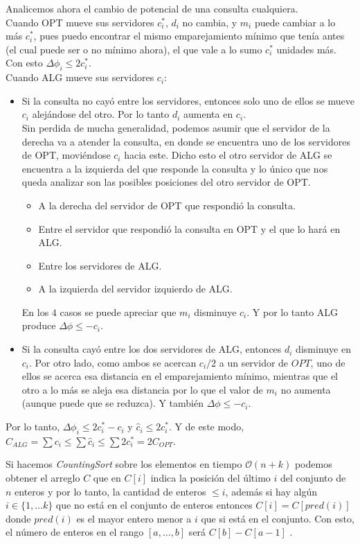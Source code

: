 \documentclass[dcc,uchile]{fcfmcourse}
\theoremstyle{plain}
\theoremstyle{definition}
\begin{document}
\begin{problems}
Analicemos ahora el cambio de potencial de una consulta cualquiera.\\
Cuando OPT mueve sus servidores $c^*_{i}$, $d_{i}$ no cambia, y $m_{i}$ puede cambiar a lo más $c^*_{i}$, pues puedo encontrar el mismo emparejamiento mínimo que tenía antes (el cual puede ser o no mínimo ahora), el que vale a lo sumo $c^*_{i}$ unidades más. Con esto $\Delta \phi_{i} \le 2c^*_{i}$.\\
Cuando ALG mueve sus servidores $c_{i}$:
\begin{itemize}
    \item Si la consulta no cayó entre los servidores, entonces solo uno de ellos se mueve $c_{i}$ alejándose del otro. Por lo tanto $d_{i}$ aumenta en $c_{i}$.\\
    Sin perdida de mucha generalidad, podemos asumir que el servidor de la derecha va a atender la consulta, en donde se encuentra uno de los servidores de OPT, moviéndose $c_{i}$ hacia este. Dicho esto el otro servidor de ALG se encuentra a la izquierda del que responde la consulta y lo único que nos queda analizar son las posibles posiciones del otro servidor de OPT.
    \begin{itemize}
        \item A la derecha del servidor de OPT que respondió la consulta.
        \item Entre el servidor que respondió la consulta en OPT y el que lo hará en ALG.
        \item Entre los servidores de ALG.
        \item A la izquierda del servidor izquierdo de ALG.
    \end{itemize}
    En los $4$ casos se puede apreciar que $m_{i}$ disminuye $c_{i}$. Y por lo tanto ALG produce $\Delta \phi \le -c_{i}$.
    \item Si la consulta cayó entre los dos servidores de ALG, entonces $d_{i}$ disminuye en $c_{i}$. Por otro lado, como ambos se acercan $c_{i}/2$ a un servidor de $OPT$, uno de ellos se acerca esa distancia en el emparejamiento mínimo, mientras que el otro a lo más se aleja esa distancia por lo que el valor de $m_{i}$ no aumenta (aunque puede que se reduzca). Y también $\Delta \phi \le -c_{i}$.
\end{itemize}
Por lo tanto, $\Delta \phi_{i} \le 2 c^*_{i} - c_{i}$ y $\hat{c}_{i} \le 2c^*_{i}$. Y de este modo, $C_{ALG} = \sum c_{i} \le \sum \hat{c}_{i} \le \sum 2c^*_{i} = 2C_{OPT}$.
\item Si hacemos \textit{CountingSort} sobre los elementos en tiempo $\mathcal{O}(n+k)$ podemos obtener el arreglo $C$ que en $C[i]$ indica la posición del último $i$ del conjunto de $n$ enteros y por lo tanto, la cantidad de enteros $\le i$, además si hay algún $i \in \{1,\ldots k\}$ que no está en el conjunto de enteros entonces $C[i] = C[pred(i)]$ donde $pred(i)$ es el mayor entero menor a $i$ que si está en el conjunto. Con esto, el número de enteros en el rango $[a,\ldots,b]$ será $C[b]-C[a-1]$ \grin .

\end{problems}
\end{document}
